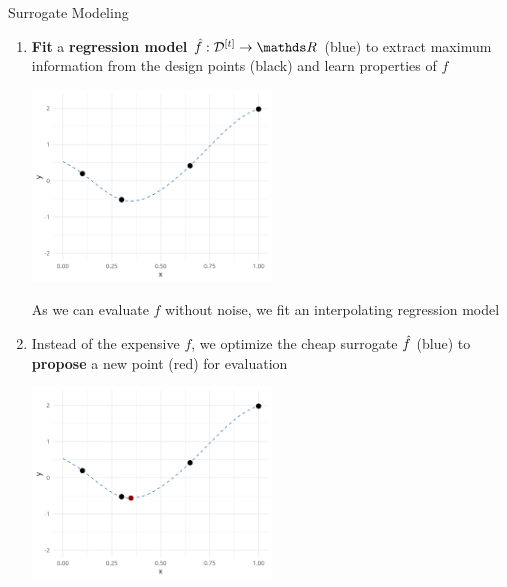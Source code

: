 \documentclass[11pt,compress,t,notes=noshow, xcolor=table]{beamer}
\begin{document}
\begin{vbframe}{Surrogate Modeling}
\begin{enumerate}
\item \textbf{Fit} a \textbf{regression model} $\fh: \Dt \rightarrow \R$ (blue) to extract maximum information from the design points (black) and learn properties of $f$
\vspace{+.05cm}

\begin{center}
  \includegraphics[width = 0.5\textwidth]{figure_man/loop_2.png}
\end{center}

\vspace{-.1cm}
As we can evaluate $f$ without noise, we fit an interpolating regression model

\framebreak 

\item Instead of the expensive $f$, we optimize the cheap 
 surrogate $\hat{f}$ (blue) to \textbf{propose} a new point (red) for evaluation 
\vspace{+.05cm}

\begin{center}
  \includegraphics[width = 0.5\textwidth]{figure_man/loop_3.png}
\end{center}



\end{enumerate}
\end{vbframe}
\end{document}
